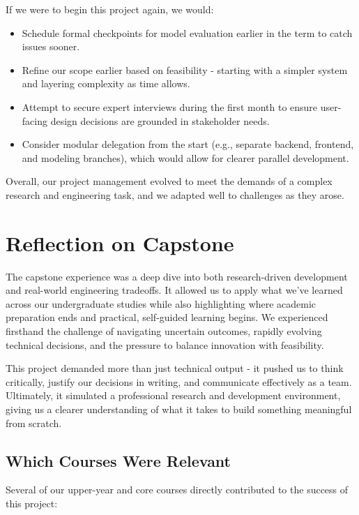 \documentclass{article}
\begin{document}
If we were to begin this project again, we would:
\begin{itemize}
    \item Schedule formal checkpoints for model evaluation earlier in the term to catch issues sooner.
    \item Refine our scope earlier based on feasibility - starting with a simpler system and layering complexity as time allows.
    \item Attempt to secure expert interviews during the first month to ensure user-facing design decisions are grounded in stakeholder needs.
    \item Consider modular delegation from the start (e.g., separate backend, frontend, and modeling branches), which would allow for clearer parallel development.
\end{itemize}

Overall, our project management evolved to meet the demands of a complex research and engineering task, and we adapted well to challenges as they arose.



\section{Reflection on Capstone}

The capstone experience was a deep dive into both research-driven development and real-world engineering tradeoffs. It allowed us to apply what we've learned across our undergraduate studies while also highlighting where academic preparation ends and practical, self-guided learning begins. We experienced firsthand the challenge of navigating uncertain outcomes, rapidly evolving technical decisions, and the pressure to balance innovation with feasibility.

This project demanded more than just technical output - it pushed us to think critically, justify our decisions in writing, and communicate effectively as a team. Ultimately, it simulated a professional research and development environment, giving us a clearer understanding of what it takes to build something meaningful from scratch.

\subsection{Which Courses Were Relevant}

Several of our upper-year and core courses directly contributed to the success of this project:
\end{document}
